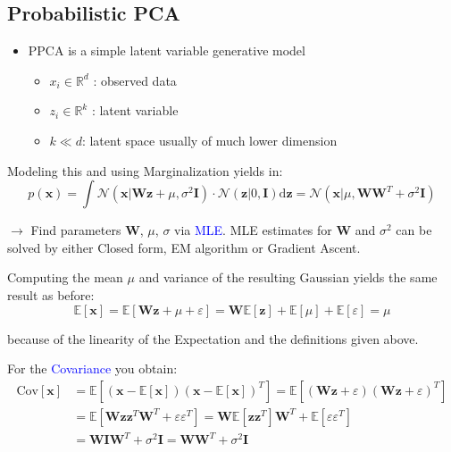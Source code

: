 \documentclass[a4paper,10pt,twoside=true,DIV=10,headsepline,plainheadsepline]{scrartcl}
\begin{document}
		\subsection{Probabilistic PCA}
		\begin{itemize}
			\item PPCA is a simple latent variable generative model
			\begin{itemize}
				\item $x_i \in \mathbb{R}^d$ : observed data
				\item $z_i \in \mathbb{R}^k$ : latent variable
				\item $k \ll d$: latent space usually of much lower dimension
			\end{itemize}
		\end{itemize}

		Modeling this and using Marginalization yields in:
		\begin{equation} 
			p(\mathbf{x}) = \int \mathcal{N}(\mathbf{x} | \mathbf{W}\mathbf{z} + \mu, \sigma^2 \mathbf{I}) \cdot \mathcal{N} (\mathbf{z} | 0, \mathbf{I} ) \textrm{d}\mathbf{z} = \mathcal{N} (\mathbf{x} |\mu,  \mathbf{W}\mathbf{W}^T + \sigma^2 \mathbf{I})
		\end{equation}

		$\rightarrow$ Find parameters $\mathbf{W}$, $\mu$, $\sigma$ via \textcolor{blue}{MLE}. MLE estimates for $\mathbf{W}$ and $\sigma^2$ can be solved by either Closed form, EM algorithm or Gradient Ascent.
		\newline

		Computing the mean $\mu$ and variance of the resulting Gaussian yields the same result as before:
		\begin{equation} 
			\mathbb{E}[\mathbf{x}] = \mathbb{E}[\mathbf{W}\mathbf{z} + \mu + \varepsilon] = \mathbf{W}\mathbb{E}[\mathbf{z}] + \mathbb{E}[\mu] + \mathbb{E}[\varepsilon] = \mu
		\end{equation}

		because of the linearity of the Expectation and the definitions given above.
		\newline

		For the \textcolor{blue}{Covariance} you obtain: 
		\begin{align} 
			\textrm{Cov}[\mathbf{x}] &= \mathbb{E}[(\mathbf{x} - \mathbb{E}[\mathbf{x}])(\mathbf{x} - \mathbb{E}[\mathbf{x}])^T] = \mathbb{E}[(\mathbf{W}\mathbf{z} + \varepsilon)(\mathbf{W}\mathbf{z} + \varepsilon)^T] \\
			&= \mathbb{E}[\mathbf{W}\mathbf{z}\mathbf{z}^T \mathbf{W}^T + \varepsilon \varepsilon^T] = \mathbf{W} \mathbb{E}[\mathbf{z}\mathbf{z}^T] \mathbf{W}^T + \mathbb{E}[\varepsilon \varepsilon^T] \\
			&= \mathbf{W}\mathbf{I}\mathbf{W}^T + \sigma^2 \mathbf{I} = \mathbf{W} \mathbf{W}^T + \sigma^2 \mathbf{I}
		\end{align}
\end{document}
